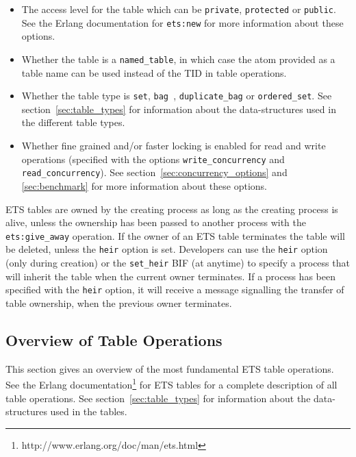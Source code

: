 \documentclass[aps,pre,preprint,nofootinbib]{revtex4}
\begin{document}
\begin{itemize}
\item 
  The access level for the table which can be \verb|private|, \verb|protected| or \verb|public|.
  See the Erlang documentation for \verb|ets:new| for more information about these options.
\item
  Whether the table is a \verb|named_table|, in which case the atom provided as a table name can be used instead of the TID in table operations.
\item 
  Whether the table type is \verb|set|, \verb|bag |, \verb|duplicate_bag| or \verb|ordered_set|. 
  See section~\ref{sec:table_types} for information about the data-structures used in the different table types.
\item 
  Whether fine grained and/or faster locking is enabled for read and write operations (specified with the options \verb|write_concurrency| and \verb|read_concurrency|). 
  See section~\ref{sec:concurrency_options} and \ref{sec:benchmark} for more information about these options.
\end{itemize}

ETS tables are owned by the creating process as long as the creating process is alive, unless the ownership has been passed to another process with the \verb|ets:give_away| operation.
If the owner of an ETS table terminates the table will be deleted, unless the \verb|heir| option is set.
Developers can use the \verb|heir| option (only during creation) or the \verb|set_heir| BIF (at anytime) to specify a process that will inherit the table when the current owner terminates. 
If a process has been specified with the \verb|heir| option, it will receive a message signalling the transfer of table ownership, when the previous owner terminates.

\subsection{Overview of Table Operations}

This section gives an overview of the most fundamental ETS table operations. 
See the Erlang documentation\footnote{http://www.erlang.org/doc/man/ets.html} for ETS tables for a complete description of all table operations. 
See section~\ref{sec:table_types} for information about the data-structures used in the tables.
\end{document}
